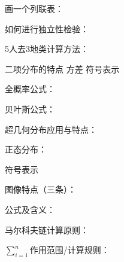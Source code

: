 画一个列联表：


如何进行独立性检验：


5人去3地类计算方法：



二项分布的特点 \clb 方差 \elb 符号表示 \clb

全概率公式：

贝叶斯公式：

超几何分布应用与特点：

正态分布：

符号表示 \clb

图像特点（三条）：

公式及含义：


马尔科夫链计算原则：


$\sum^{n}_{i=1}$作用范围/计算规则：
